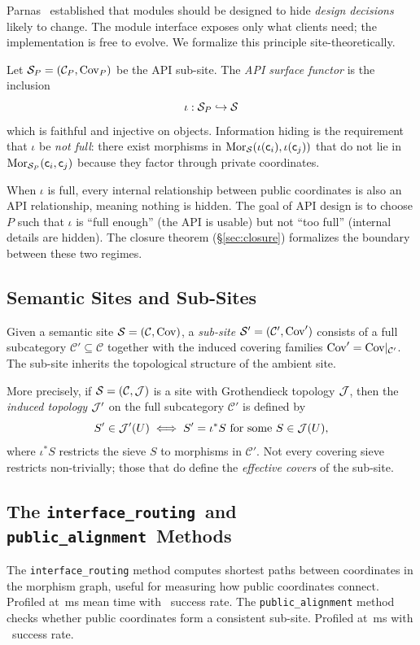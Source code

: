 \documentclass[11pt]{article}
\newcommand{\InterfRoute}{\texttt{interface\_routing}}
\newcommand{\PubAlign}{\texttt{public\_alignment}}
\begin{document}
Parnas~\cite{Parnas1972} established that modules should be designed to
hide \emph{design decisions} likely to change.  The module interface
exposes only what clients need; the implementation is free to evolve.
We formalize this principle site-theoretically.

\begin{definition}\label{def:api-functor}
Let $\mathcal{S}_P = (\mathcal{C}_P, \mathrm{Cov}_P)$ be the API sub-site.  The
\emph{API surface functor} is the inclusion
\[
  \iota : \mathcal{S}_P \hookrightarrow \mathcal{S}
\]
which is faithful and injective on objects.  Information hiding is the
requirement that $\iota$ be \emph{not full}: there exist morphisms in
$\mathrm{Mor}_{\mathcal{S}}(\iota(\mathsf{c}_i), \iota(\mathsf{c}_j))$ that do not lie in
$\mathrm{Mor}_{\mathcal{S}_P}(\mathsf{c}_i, \mathsf{c}_j)$ because they factor through private
coordinates.
\end{definition}

When $\iota$ is full, every internal relationship between public
coordinates is also an API relationship, meaning nothing is hidden.
The goal of API design is to choose $P$ such that $\iota$ is ``full enough''
(the API is usable) but not ``too full'' (internal details are hidden).
The closure theorem (§\ref{sec:closure}) formalizes the boundary between
these two regimes.

\subsection{Semantic Sites and Sub-Sites}
Given a semantic site $\mathcal{S} = (\mathcal{C}, \mathrm{Cov})$, a \emph{sub-site}
$\mathcal{S}' = (\mathcal{C}', \mathrm{Cov}')$ consists of a full subcategory
$\mathcal{C}' \subseteq \mathcal{C}$ together with the induced covering
families $\mathrm{Cov}' = \mathrm{Cov}|_{\mathcal{C}'}$.  The sub-site inherits the
topological structure of the ambient site.

More precisely, if $\mathcal{S} = (\mathcal{C}, \mathcal{J})$ is a site with Grothendieck
topology $\mathcal{J}$, then the \emph{induced topology} $\mathcal{J}'$ on the full
subcategory $\mathcal{C}'$ is defined by
\[
  S' \in \mathcal{J}'(U) \iff S' = \iota^{*}S \text{ for some } S \in \mathcal{J}(U),
\]
where $\iota^{*}S$ restricts the sieve $S$ to morphisms in $\mathcal{C}'$.
Not every covering sieve restricts non-trivially; those that do define the
\emph{effective covers} of the sub-site.

\subsection{The \InterfRoute\ and \PubAlign\ Methods}
The \texttt{interface\_routing} method computes shortest paths between
coordinates in the morphism graph, useful for measuring how public
coordinates connect.  Profiled at \compProfInterfaceRoutingMeanMs\,ms
mean time with \compProfInterfaceRoutingRate\ success rate.  The
\texttt{public\_alignment} method checks whether public coordinates form
a consistent sub-site.  Profiled at \compProfPublicAlignmentMeanMs\,ms
with \compProfPublicAlignmentRate\ success rate.
\end{document}
